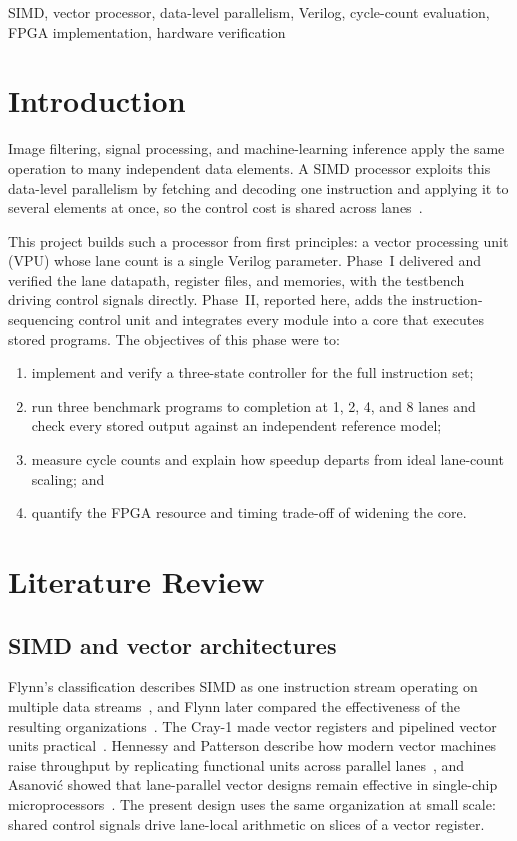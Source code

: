 \documentclass[conference]{IEEEtran}
\begin{document}
\begin{IEEEkeywords}
SIMD, vector processor, data-level parallelism, Verilog, cycle-count
evaluation, FPGA implementation, hardware verification
\end{IEEEkeywords}

\section{Introduction}

Image filtering, signal processing, and machine-learning inference apply the
same operation to many independent data elements. A SIMD processor exploits
this data-level parallelism by fetching and decoding one instruction and
applying it to several elements at once, so the control cost is shared across
lanes~\cite{flynn1966very,hennessy2017computer}.

This project builds such a processor from first principles: a vector
processing unit (VPU) whose lane count is a single Verilog parameter. Phase~I
delivered and verified the lane datapath, register files, and memories, with
the testbench driving control signals directly. Phase~II, reported here,
adds the instruction-sequencing control unit and integrates every module into
a core that executes stored programs. The objectives of this phase were to:
\begin{enumerate}
  \item implement and verify a three-state controller for the full instruction
        set;
  \item run three benchmark programs to completion at 1, 2, 4, and 8 lanes and
        check every stored output against an independent reference model;
  \item measure cycle counts and explain how speedup departs from ideal
        lane-count scaling; and
  \item quantify the FPGA resource and timing trade-off of widening the core.
\end{enumerate}

\section{Literature Review}

\subsection{SIMD and vector architectures}
Flynn's classification describes SIMD as one instruction stream operating on
multiple data streams~\cite{flynn1966very}, and Flynn later compared the
effectiveness of the resulting organizations~\cite{flynn1972some}. The
Cray-1 made vector registers and pipelined vector units
practical~\cite{russell1978cray}. Hennessy and Patterson describe how modern
vector machines raise throughput by replicating functional units across
parallel lanes~\cite{hennessy2017computer}, and Asanovi\'c showed that
lane-parallel vector designs remain effective in single-chip
microprocessors~\cite{asanovic1998vector}. The present design uses the same
organization at small scale: shared control signals drive lane-local
arithmetic on slices of a vector register.
\end{document}
